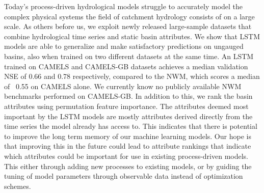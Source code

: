 Today's process-driven hydrological models struggle to accurately model the complex physical 
systems the field of catchment hydrology consists of on a large scale. 
As others before us, we exploit newly released large-sample datasets that combine 
hydrological time series and static basin attributes.
We show that LSTM models are able to generalize and make satisfactory predictions 
on ungauged basins, also when trained on two different datasets at the same time. 
An LSTM trained on CAMELS and CAMELS-GB datasets achieves a median validation NSE of 0.66 
and 0.78 respectively, compared to the NWM, which scores a median of ~0.55 on CAMELS alone.
We currently know no publicly available NWM benchmarks performed on CAMELS-GB.
In addition to this, we rank the basin attributes using permutation feature importance.
The attributes deemed most important by the LSTM models are mostly attributes derived 
directly from the time series the model already has access to. This indicates that 
there is potential to improve the long term memory of our machine learning models.
Our hope is that improving this in the future could lead to attribute rankings 
that indicate which attributes could be important for use in existing process-driven 
models. This either through adding new processes to existing models, or by guiding the 
tuning of model parameters through observable data instead of optimization schemes.
